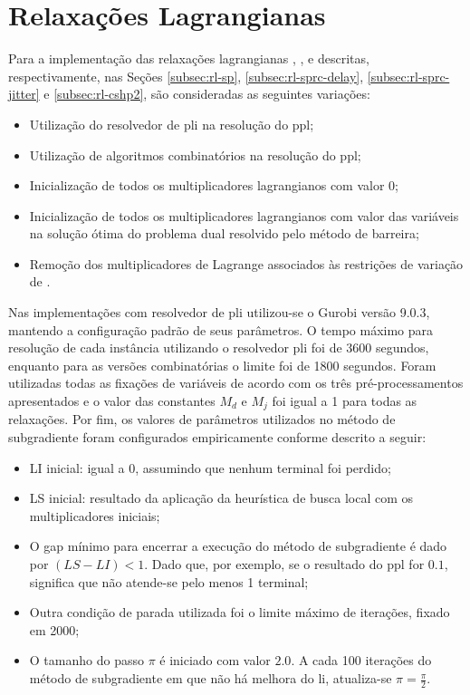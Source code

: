 \section{Relaxações Lagrangianas} \label{sec:resultados-rls}

Para a  implementação das  relaxações lagrangianas {\rlu,  \rld, \rlt}  e {\rlq}
descritas,       respectivamente,      nas       Seções      \ref{subsec:rl-sp},
\ref{subsec:rl-sprc-delay}, \ref{subsec:rl-sprc-jitter} e \ref{subsec:rl-cshp2},
são consideradas as seguintes variações:

\begin{itemize}
\item Utilização do resolvedor de \gls{pli} na resolução do \gls{ppl};
\item Utilização de algoritmos combinatórios na resolução do \gls{ppl};
\item Inicialização de todos os multiplicadores lagrangianos com valor 0;
\item  Inicialização de  todos  os multiplicadores  lagrangianos  com valor  das
variáveis na solução ótima do problema dual resolvido pelo método de barreira;
\item  Remoção  dos multiplicadores  de  Lagrange  associados às  restrições  de
variação de {\delay}.
\end{itemize}

Nas  implementações com  resolvedor  de \gls{pli}  utilizou-se  o Gurobi  versão
9.0.3, mantendo  a configuração padrão de  seus parâmetros. O tempo  máximo para
resolução  de cada  instância  utilizando  o resolvedor  \gls{pli}  foi de  3600
segundos, enquanto para as versões combinatórias  o limite foi de 1800 segundos.
Foram  utilizadas  todas  as  fixações  de  variáveis  de  acordo  com  os  três
pré-processamentos apresentados e o valor das constantes $M_d$ e $M_j$ foi igual
a 1 para  todas as relaxações. Por  fim, os valores de  parâmetros utilizados no
método  de subgradiente  foram  configurados empiricamente  conforme descrito  a
seguir:

\begin{itemize}
\item LI inicial: igual a 0, assumindo que nenhum terminal foi perdido;
\item LS  inicial: resultado da  aplicação da heurística  de busca local  com os
multiplicadores iniciais;
\item O gap mínimo para encerrar a execução do método de subgradiente é dado por
$(LS - LI) < 1$. Dado que, por exemplo, se o resultado do \gls{ppl} for ${0.1}$,
significa que não atende-se pelo menos 1 terminal;
\item  Outra condição  de parada  utilizada foi  o limite  máximo de  iterações,
fixado em 2000;
\item O tamanho do passo $\pi$ é  iniciado com valor $2.0$. A cada 100 iterações
do método de subgradiente em que não  há melhora do \gls{li}, atualiza-se $\pi =
\frac{\pi}{2}$.
\end{itemize}

